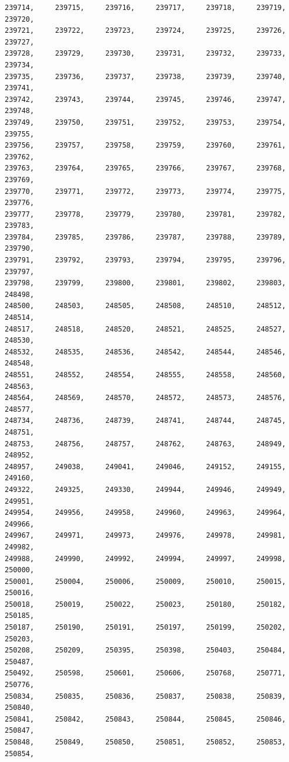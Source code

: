 \documentclass[a4paper,11pt]{report}
\begin{document}
\begin{verbatim}
239714,     239715,     239716,     239717,     239718,     239719,     239720,
239721,     239722,     239723,     239724,     239725,     239726,     239727,
239728,     239729,     239730,     239731,     239732,     239733,     239734,
239735,     239736,     239737,     239738,     239739,     239740,     239741,
239742,     239743,     239744,     239745,     239746,     239747,     239748,
239749,     239750,     239751,     239752,     239753,     239754,     239755,
239756,     239757,     239758,     239759,     239760,     239761,     239762,
239763,     239764,     239765,     239766,     239767,     239768,     239769,
239770,     239771,     239772,     239773,     239774,     239775,     239776,
239777,     239778,     239779,     239780,     239781,     239782,     239783,
239784,     239785,     239786,     239787,     239788,     239789,     239790,
239791,     239792,     239793,     239794,     239795,     239796,     239797,
239798,     239799,     239800,     239801,     239802,     239803,     248498,
248500,     248503,     248505,     248508,     248510,     248512,     248514,
248517,     248518,     248520,     248521,     248525,     248527,     248530,
248532,     248535,     248536,     248542,     248544,     248546,     248548,
248551,     248552,     248554,     248555,     248558,     248560,     248563,
248564,     248569,     248570,     248572,     248573,     248576,     248577,
248734,     248736,     248739,     248741,     248744,     248745,     248751,
248753,     248756,     248757,     248762,     248763,     248949,     248952,
248957,     249038,     249041,     249046,     249152,     249155,     249160,
249322,     249325,     249330,     249944,     249946,     249949,     249951,
249954,     249956,     249958,     249960,     249963,     249964,     249966,
249967,     249971,     249973,     249976,     249978,     249981,     249982,
249988,     249990,     249992,     249994,     249997,     249998,     250000,
250001,     250004,     250006,     250009,     250010,     250015,     250016,
250018,     250019,     250022,     250023,     250180,     250182,     250185,
250187,     250190,     250191,     250197,     250199,     250202,     250203,
250208,     250209,     250395,     250398,     250403,     250484,     250487,
250492,     250598,     250601,     250606,     250768,     250771,     250776,
250834,     250835,     250836,     250837,     250838,     250839,     250840,
250841,     250842,     250843,     250844,     250845,     250846,     250847,
250848,     250849,     250850,     250851,     250852,     250853,     250854,

\end{verbatim}
\end{document}
